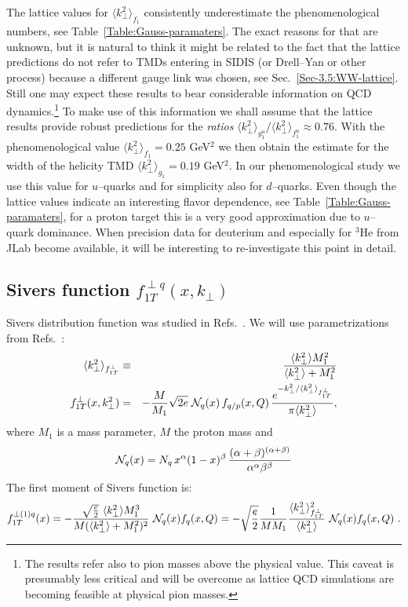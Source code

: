 \documentclass[a4paper,11pt]{article}
\newcommand{\ba}{\begin{eqnarray}}
\newcommand{\ea}{\end{eqnarray}}
\newcommand{\la}{\langle}
\newcommand{\ra}{\rangle}
\def\kperp{k_\perp}
\def\avkperp{\la \kperp^2 \ra}
\begin{document}
The lattice values for $\langle \kperp^2 \rangle_{f_1}$ consistently
underestimate the phenomenological numbers, see
Table~\ref{Table:Gauss-paramaters}.
The exact reasons for that are unknown, but it is natural to think it
might be related to the fact that the lattice predictions \cite{Hagler:2009mb}
do not refer to TMDs entering in SIDIS (or Drell--Yan or other process)
because a different gauge link was chosen, see Sec.~\ref{Sec-3.5:WW-lattice}.
Still one may expect these results to bear considerable information
on QCD dynamics.\footnote{
	The results \cite{Hagler:2009mb} refer also to pion masses above the
	physical value. This caveat is presumably less critical and
	will be overcome as lattice QCD simulations are becoming feasible
	at physical pion masses.}
To make use of this information we shall assume that the lattice results
\cite{Hagler:2009mb} provide robust predictions for the {\it ratios}
$\langle \kperp^2 \rangle_{g_1^u}/\langle \kperp^2 \rangle_{f_1^u}\approx 0.76$.
With the phenomenological value $\langle \kperp^2 \rangle_{f_1} = 0.25$ GeV$^2$
we then obtain the estimate for the width of the helicity TMD
$\langle \kperp^2 \rangle_{g_1} = 0.19$ GeV$^2$.
In our phenomenological study we use this value for $u$--quarks and for
simplicity also for $d$--quarks. Even though the lattice values indicate
an interesting flavor dependence, see Table~\ref{Table:Gauss-paramaters},
for a proton target this is a very good approximation due to $u$--quark
dominance. When precision data for deuterium and especially for $^3$He
from JLab become available, it will be interesting to
re-investigate this point in detail.

\subsection{\boldmath Sivers function $f_{1T}^{\perp q}(x,k_\perp)$}
\label{App:basis-f1Tperp}

Sivers distribution function was studied in Refs.~\cite{Efremov:2004tp,Anselmino:2008sga,Anselmino:2011gs,Anselmino:2011ch, Aybat:2011ge,Gamberg:2013kla,Bacchetta:2011gx,Anselmino:2012aa,Sun:2013dya,Echevarria:2014xaa}.
We will use parametrizations from  Refs.~\cite{Anselmino:2008sga,Anselmino:2011gs,Anselmino:2011ch}:
\ba
 \avkperp_{f_{1T}^\perp} &\equiv& \frac{\avkperp M_1^2}{\avkperp + M_1^2} \\
f_{1T}^{\perp}(x, \kperp^2)& =& - \frac {M}{M_1} \sqrt{2e} \;
{\cal N}_q(x) \, f_{q/p} (x,Q) \, \frac{e^{-\kperp^2/{\avkperp_{f_{1T}^\perp}}}}{\pi \avkperp} ,
\label{fiTp}
\ea
%
where $M_1$ is a mass parameter, $M$ the proton mass and
%
\ba
{\cal N}_q(x)= N_q \, x^{\alpha} (1-x)^{\beta} \,
\frac{(\alpha + \beta)^{(\alpha +\beta)}}
{\alpha^{\alpha} \beta^{\beta}}
 \ea
The first moment of Sivers function is:
\ba
f_{1T}^{\perp (1) q}(x)  = -\frac{\sqrt{\frac{e}{2}} \ \avkperp M_1^3}{M (\avkperp + M_1^2)^2}  \ {\cal N}_q(x)  f_q(x, Q) = -\sqrt{\frac{e}{2}} \frac{1}{M M_1}  \frac{\avkperp_{f_{1T}^\perp}^2}{\avkperp}    \ {\cal N}_q(x)  f_q(x, Q)
\label{siversm} \ .
\ea
\end{document}
